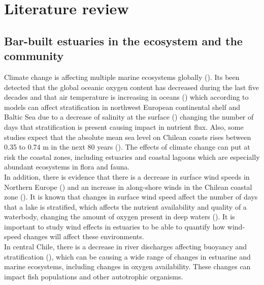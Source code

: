\documentclass[tesis.tex]{subfiles}
\begin{document}
    
\section{Literature review}

\subsection{Bar-built estuaries in the ecosystem and the community}

Climate change is affecting multiple marine ecosystems globally (\cite{hewitt2016multiple}). Its been detected that the global oceanic oxygen content has decreased during the last five decades \cite{schmidtko2017decline} and that air temperature is increasing in oceans (\cite{omstedt2004baltic, jones1999surface}) which according to models can affect stratification in northwest European continental shelf and Baltic Sea due to a decrease of salinity at the surface (\cite{hordoir2012effect, holt2010potential}) changing the number of days that stratification is present causing impact in nutrient flux. Also, some studies expect that the absolute mean sea level on Chilean coasts rises between 0.35 to 0.74 m in the next 80 years (\cite{winckler2020evidence}). The effects of climate change can put at risk the coastal zones, including estuaries and coastal lagoons which are especially abundant ecosystems in flora and fauna.\\

In addition, there is evidence that there is a decrease in surface wind speeds in Northern Europe (\cite{woolway2017atmospheric}) and an increase in along-shore winds in the Chilean coastal zone (\cite{winckler2020evidence}). It is known that changes in surface wind speed affect the number of days that a lake is stratified, which affects the nutrient availability and quality of a waterbody, changing the amount of oxygen present in deep waters (\cite{woolway2017atmospheric}). It is important to study wind effects in estuaries to be able to quantify how wind-speed changes will affect these environments.\\

In central Chile, there is a decrease in river discharges affecting buoyancy and stratification (\cite{winckler2020evidence}), which can be causing a wide range of changes in estuarine and marine ecosystems, including changes in oxygen availability. These changes can impact fish populations and other autotrophic organisms.\\
\end{document}
